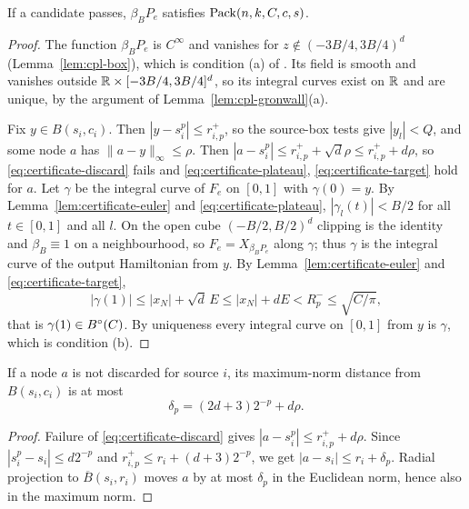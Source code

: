 \begin{theorem}[Soundness]\label{thm:certificate-sound}
If a candidate passes, $\beta_BP_e$ satisfies $\mathrm{Pack}(n,k,C,c,s)$.
\end{theorem}

\begin{proof}
The function $\beta_BP_e$ is $C^\infty$ and vanishes for $z\notin(-3B/4,3B/4)^d$ (Lemma~\ref{lem:cpl-box}), which
is condition (a) of . Its field is smooth and vanishes outside
$\mathbb{R}\times[-3B/4,3B/4]^d$, so its integral curves exist on $\mathbb{R}$ and are unique, by the argument of
Lemma~\ref{lem:cpl-gronwall}(a).

Fix $y\in B(s_i,c_i)$. Then $|y-s_i^p|\le r^+_{i,p}$, so the source-box tests give $|y_l|<Q$, and some node $a$ has
$\|a-y\|_\infty\le\rho$. Then $|a-s_i^p|\le r^+_{i,p}+\sqrt d\rho\le r^+_{i,p}+d\rho$, so \eqref{eq:certificate-discard}
fails and \eqref{eq:certificate-plateau}, \eqref{eq:certificate-target} hold for $a$. Let $\gamma$ be the integral curve
of $F_e$ on $[0,1]$ with $\gamma(0)=y$. By Lemma~\ref{lem:certificate-euler} and \eqref{eq:certificate-plateau},
$|\gamma_l(t)|<B/2$ for all $t\in[0,1]$ and all $l$. On the open cube $(-B/2,B/2)^d$ clipping is the identity and
$\beta_B\equiv1$ on a neighbourhood, so $F_e=X_{\beta_BP_e}$ along $\gamma$; thus $\gamma$ is the integral curve of the
output Hamiltonian from $y$. By Lemma~\ref{lem:certificate-euler} and \eqref{eq:certificate-target},
\[
 |\gamma(1)|\le|x_N|+\sqrt d\,E\le|x_N|+dE<R^-_p\le\sqrt{C/\pi},
\]
that is $\gamma(1)\in B^{\circ}(C)$. By uniqueness every integral curve on $[0,1]$ from $y$ is $\gamma$, which is condition (b).
\end{proof}

\begin{lemma}\label{lem:certificate-retained}
If a node $a$ is not discarded for source $i$, its maximum-norm distance from $B(s_i,c_i)$ is at most
\[
 \delta_p=(2d+3)2^{-p}+d\rho.
\]
\end{lemma}

\begin{proof}
Failure of \eqref{eq:certificate-discard} gives $|a-s_i^p|\le r^+_{i,p}+d\rho$. Since $|s_i^p-s_i|\le d2^{-p}$ and
$r^+_{i,p}\le r_i+(d+3)2^{-p}$, we get $|a-s_i|\le r_i+\delta_p$. Radial projection to $\overline B(s_i,r_i)$ moves $a$
by at most $\delta_p$ in the Euclidean norm, hence also in the maximum norm.
\end{proof}

